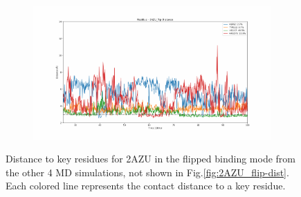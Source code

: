 \begin{figure}[!ht]
\begin{subfigure}{.45\textwidth}
  \end{subfigure}
    \begin{subfigure}{.45\textwidth}
     \centering
     \includegraphics[width=.95\linewidth]{chapter4/2AZU_flip/2AZU_flip-dist_3.pdf}
  \end{subfigure}
\caption[Key residues distances for $2AZU_{flip}$]{Distance to key residues for 2AZU in the flipped binding mode from the other 4 MD simulations, not shown in Fig.\ref{fig:2AZU_flip-dist}. Each colored line represents the contact distance to a key residue.}
\label{sup:2AZU_flip-dist}
\end{figure}  